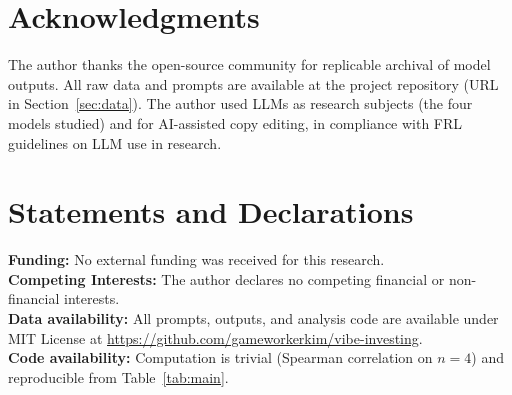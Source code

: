 \documentclass[11pt,letterpaper]{article}
\begin{document}
\section*{Acknowledgments}

The author thanks the open-source community for replicable archival of model outputs. All raw data and prompts are available at the project repository (URL in Section~\ref{sec:data}). The author used LLMs as research subjects (the four models studied) and for AI-assisted copy editing, in compliance with FRL guidelines on LLM use in research.

\section*{Statements and Declarations}

\noindent\textbf{Funding:} No external funding was received for this research.\\
\textbf{Competing Interests:} The author declares no competing financial or non-financial interests.\\
\textbf{Data availability:} All prompts, outputs, and analysis code are available under MIT License at \url{https://github.com/gameworkerkim/vibe-investing}.\\
\textbf{Code availability:} Computation is trivial (Spearman correlation on $n=4$) and reproducible from Table~\ref{tab:main}.

\renewcommand\refname{References}
\end{document}
